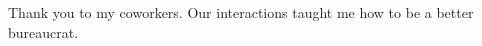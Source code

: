 \thispagestyle{empty}

Thank you to my coworkers. Our interactions taught me how to be a better bureaucrat.